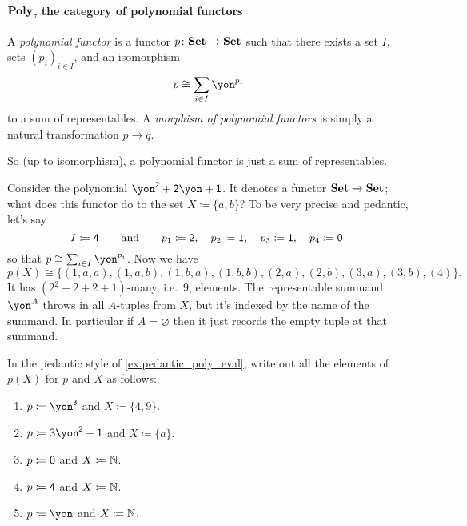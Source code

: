 \documentclass[DynamicalBook]{subfiles}
\begin{document}
\paragraph{$\textbf{Poly}$, the category of polynomial functors}

\begin{definition}
A \emph{polynomial functor} is a functor $p\colon\textbf{Set}\to\textbf{Set}$ such that there exists a set $I$, sets $(p_i)_{i\in I}$, and an isomorphism
\[p\cong\sum_{i\in I}\yon^{p_i}\]
to a sum of representables.
A \emph{morphism of polynomial functors} is simply a natural transformation $p\to q$.
\end{definition}

So (up to isomorphism), a polynomial functor is just a sum of representables.

\begin{example}\label{ex.pedantic_poly_eval}
Consider the polynomial $\yon^\2+\2\yon+\1$. It denotes a functor $\textbf{Set}\to\textbf{Set}$; what does this functor do to the set $X\coloneqq\{a,b\}$? 
To be very precise and pedantic, let's say
\[
I\coloneqq\textsf{4}\qquad\text{and}\qquad
  p_1\coloneqq\textsf{2},\quad
  p_2\coloneqq\textsf{1},\quad
  p_3\coloneqq\textsf{1},\quad
  p_4\coloneqq\textsf{0}\
\]
so that $p\cong\sum_{i\in I}\yon^{p_i}$. Now we have
\[
p(X)\cong
\{(1,a,a),(1,a,b),(1,b,a),(1,b,b),(2,a),(2,b),(3,a),(3,b),(4)\}.
\]
It has $(2^2+2+2+1)$-many, i.e.\ $9$, elements. The representable summand $\yon^A$ throws in all $A$-tuples from $X$, but it's indexed by the name of the summand. In particular if $A=\varnothing$ then it just records the empty tuple at that summand.
\end{example}

\begin{exercise}
In the pedantic style of \cref{ex.pedantic_poly_eval}, write out all the elements of $p(X)$ for $p$ and $X$ as follows:
\begin{enumerate}
	\item $p\coloneqq\yon^\3$ and $X\coloneqq\{4,9\}.$
	\item $p\coloneqq\3\yon^\2+\1$ and $X\coloneqq\{a\}$.
	\item $p\coloneqq\textsf{0}$ and $X\coloneqq\mathbb{N}$.
	\item $p\coloneqq\textsf{4}$ and $X\coloneqq\mathbb{N}$.
	\item $p\coloneqq\yon$ and $X\coloneqq\mathbb{N}$.
\qedhere
\end{enumerate}
\end{exercise}
\end{document}

